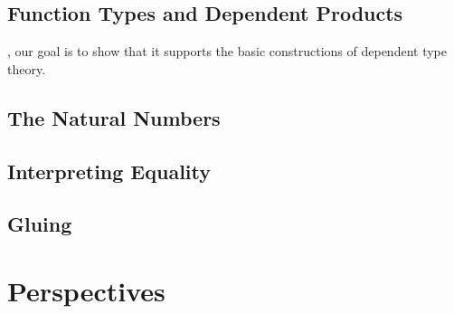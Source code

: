 \subsection{Function Types and Dependent Products}

, our goal is to show that it
supports the basic constructions of dependent type theory.
% 

\subsection{The Natural Numbers}


\subsection{Interpreting Equality}



\subsection{Gluing}

\section{Perspectives}